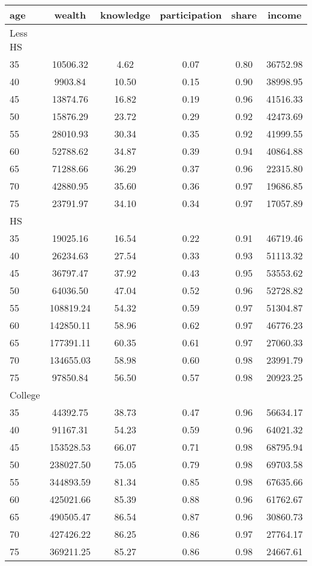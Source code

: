  \begin{tabular}{lccccc}
 \hline \hline
  age & wealth & knowledge & participation & share & income \\
 \hline
 Less HS & & & & & \\
 \hline
35 &  10506.32 &      4.62 &      0.07 &      0.80 &  36752.98 \\ 
40 &   9903.84 &     10.50 &      0.15 &      0.90 &  38998.95 \\ 
45 &  13874.76 &     16.82 &      0.19 &      0.96 &  41516.33 \\ 
50 &  15876.29 &     23.72 &      0.29 &      0.92 &  42473.69 \\ 
55 &  28010.93 &     30.34 &      0.35 &      0.92 &  41999.55 \\ 
60 &  52788.62 &     34.87 &      0.39 &      0.94 &  40864.88 \\ 
65 &  71288.66 &     36.29 &      0.37 &      0.96 &  22315.80 \\ 
70 &  42880.95 &     35.60 &      0.36 &      0.97 &  19686.85 \\ 
75 &  23791.97 &     34.10 &      0.34 &      0.97 &  17057.89 \\ 
 \hline
 HS & & & & & \\
 \hline
35 &  19025.16 &     16.54 &      0.22 &      0.91 &  46719.46 \\ 
40 &  26234.63 &     27.54 &      0.33 &      0.93 &  51113.32 \\ 
45 &  36797.47 &     37.92 &      0.43 &      0.95 &  53553.62 \\ 
50 &  64036.50 &     47.04 &      0.52 &      0.96 &  52728.82 \\ 
55 & 108819.24 &     54.32 &      0.59 &      0.97 &  51304.87 \\ 
60 & 142850.11 &     58.96 &      0.62 &      0.97 &  46776.23 \\ 
65 & 177391.11 &     60.35 &      0.61 &      0.97 &  27060.33 \\ 
70 & 134655.03 &     58.98 &      0.60 &      0.98 &  23991.79 \\ 
75 &  97850.84 &     56.50 &      0.57 &      0.98 &  20923.25 \\ 
 \hline
 College & & & & & \\
 \hline
35 &  44392.75 &     38.73 &      0.47 &      0.96 &  56634.17 \\ 
40 &  91167.31 &     54.23 &      0.59 &      0.96 &  64021.32 \\ 
45 & 153528.53 &     66.07 &      0.71 &      0.98 &  68795.94 \\ 
50 & 238027.50 &     75.05 &      0.79 &      0.98 &  69703.58 \\ 
55 & 344893.59 &     81.34 &      0.85 &      0.98 &  67635.66 \\ 
60 & 425021.66 &     85.39 &      0.88 &      0.96 &  61762.67 \\ 
65 & 490505.47 &     86.54 &      0.87 &      0.96 &  30860.73 \\ 
70 & 427426.22 &     86.25 &      0.86 &      0.97 &  27764.17 \\ 
75 & 369211.25 &     85.27 &      0.86 &      0.98 &  24667.61 \\ 
 \hline \hline
 \end{tabular}
